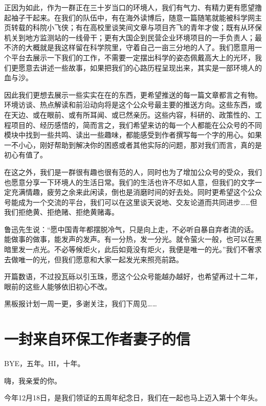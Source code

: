 \documentclass[]{book}
\begin{document}
正因为如此，作为一群正在三十岁当口的环境人，我们有气力、有精力更有愿望撸起袖子干起来。在我们的队伍中，有在海外读博后，随意一篇随笔就能被科学网主页转载的科院小飞侠；有在高校里谈笑间文章与项目齐飞的青年才俊；既有从环保机关到地方监测站的一线骨干；更有大国企到民营企业环境项目的一手负责人；最不济的大概就是我这样留在科学院里，守着自己一亩三分地的人了。我们愿意用一个平台去展示一下我们的工作，不需要一定摆出科学的姿态佩戴高大上的光环，我们更愿意去讲述一些故事，如果把我们的心路历程呈现出来，其实是一部环境人的血与沙。

因此我们更想去展示一些实实在在的东西，更希望推送的每一篇文章都言之有物。环境访谈、热点解读和前沿动向将是这个公众号最主要的推送方向。这些东西，或在天边、或在眼前、或有所耳闻、或已然亲历。这些内容，科研的、政策性的、工程项目的、经历感悟的，简而言之，我们希望来访的每一个人都能在公众号的不同模块中找到一些共鸣、读出一些趣味，都能感受到作者撰写每一个字的用心。如果一不小心，刚好帮助到解决你的困惑或者其他实际的问题，那对我们而言，真的是初心有值了。

在这之外，我们是一群很有趣也很有范的人，同时也为了增加公众号的受众，我们也愿意分享一下环境人的生活日常。我们的生活也许不尽如人意，但我们的文字一定充满情趣，疲劳之余来此闲读，倒也是消磨时间的好去处。同时更希望这个公众号能成为一个交流的平台，我们可以在这里谈天说地、交友论道而共同进步\ldots{}\ldots{}但我们拒绝黄、拒绝赌、拒绝黄赌毒。

鲁迅先生说：``愿中国青年都摆脱冷气，只是向上走，不必听自暴自弃者流的话。能做事的做事，能发声的发声。有一分热，发一分光。就令萤火一般，也可以在黑暗里发一点光。不必等候炬火，此后如竟没有炬火，我便是唯一的光。''我们不奢求去做唯一的光，但我们愿意和大家一起发光来照亮前路。

开篇数语，不过投瓦砾以引玉珠，愿这个公众号能越办越好，也希望再过十二年，眼前的这些人能够依旧初心不改。

黑板报计划一周一更，多谢关注，我们下周见\ldots{}\ldots{}

\section{一封来自环保工作者妻子的信}

BYE，五年。HI，十年。

嗨，我亲爱的你。

今年12月18日，是我们领证的五周年纪念日，我们在一起也马上迈入第十个年头。
\end{document}
